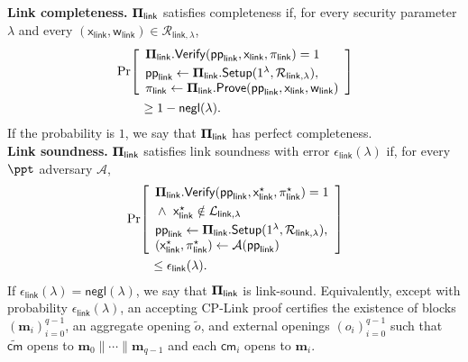 \documentclass[conference,compsoc]{IEEEtran}
\newcommand{\para}{\textsf{pp}}
\newcommand{\cm}{\textsf{cm}}
\newcommand{\vect}{\mathbf}         %
\newcommand{\bPi}{{\bf \Pi}}
\newcommand{\setup}{{\sf Setup}}
\newcommand{\prove}{{\sf Prove}}
\renewcommand{\verify}{{\sf Verify}}
\newcommand{\relation}{{\mathcal{R}}}
\newcommand{\stmt}{\mathsf{x}}      %
\newcommand{\wit}{\mathsf{w}}       %
\theoremstyle{plain}
\theoremstyle{definition}
\theoremstyle{remark}
\begin{document}
\noindent\textbf{Link completeness.}
\(\bPi_{\mathsf{link}}\) satisfies completeness if, for every security
parameter \(\lambda\) and every
\((\stmt_{\mathsf{link}},\wit_{\mathsf{link}})
\in\relation_{\mathsf{link},\lambda}\),
\[
\begin{aligned}
&\Pr\!\left[
\begin{array}{l}
  \bPi_{\mathsf{link}}.\verify(
    \para_{\mathsf{link}},
    \stmt_{\mathsf{link}},
    \pi_{\mathsf{link}}
  )=1
  \\[1mm]
  \para_{\mathsf{link}}
    \gets
    \bPi_{\mathsf{link}}.\setup(
      1^\lambda,\relation_{\mathsf{link},\lambda}
    ),\\
  \pi_{\mathsf{link}}
    \gets
    \bPi_{\mathsf{link}}.\prove(
      \para_{\mathsf{link}},
      \stmt_{\mathsf{link}},
      \wit_{\mathsf{link}}
    )
\end{array}
\right]
\\
&\hspace{2em}\ge 1-\textsf{negl}(\lambda).
\end{aligned}
\]
If the probability is \(1\), we say that
\(\bPi_{\mathsf{link}}\) has perfect completeness. \\

\noindent\textbf{Link soundness.}
\(\bPi_{\mathsf{link}}\) satisfies link soundness with error
\(\epsilon_{\mathsf{link}}(\lambda)\) if, for every \(\ppt\) adversary
\(\mathcal{A}\),
\[
\begin{aligned}
&\Pr\!\left[
\begin{array}{l}
  \bPi_{\mathsf{link}}.\verify(
    \para_{\mathsf{link}},
    \stmt_{\mathsf{link}}^\star,
    \pi_{\mathsf{link}}^\star
  )=1
  \\[1mm]
  {}\wedge{}\ 
  \stmt_{\mathsf{link}}^\star
  \notin
  \mathcal{L}_{\mathsf{link},\lambda}
  \\[1mm]
  \para_{\mathsf{link}}
    \gets
    \bPi_{\mathsf{link}}.\setup(
      1^\lambda,\relation_{\mathsf{link},\lambda}
    ),\\
  (\stmt_{\mathsf{link}}^\star,\pi_{\mathsf{link}}^\star)
    \gets
    \mathcal{A}(\para_{\mathsf{link}})
\end{array}
\right]
\\
&\hspace{2em}\le \epsilon_{\mathsf{link}}(\lambda).
\end{aligned}
\]
If \(\epsilon_{\mathsf{link}}(\lambda)=\textsf{negl}(\lambda)\), we say that
\(\bPi_{\mathsf{link}}\) is link-sound.  Equivalently, except with probability
\(\epsilon_{\mathsf{link}}(\lambda)\), an accepting CP-Link proof certifies the
existence of blocks \((\vect{m}_i)_{i=0}^{q-1}\), an aggregate opening
\(\widetilde{o}\), and external openings \((o_i)_{i=0}^{q-1}\) such that
\(\widetilde{\cm}\) opens to
\(\vect{m}_0\|\cdots\|\vect{m}_{q-1}\) and each \(\cm_i\) opens to
\(\vect{m}_i\). \\
\end{document}

